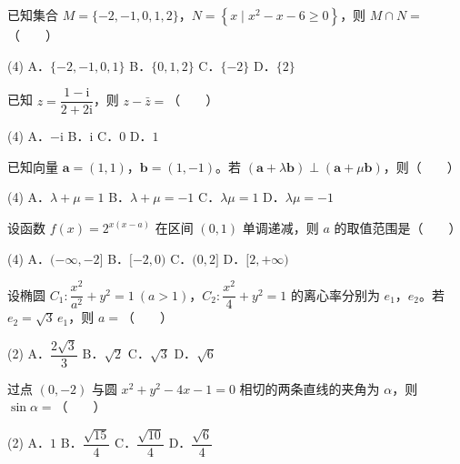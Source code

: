 \begin{question}
已知集合 $M=\{-2,-1,0,1,2\}$，$N=\left\{x\mid x^{2}-x-6\ge0\right\}$，则 $M\cap N=$\mbox{（　　）}

\begin{gkopts}(4)
\task A．$\{-2,-1,0,1\}$
\task B．$\{0,1,2\}$
\task C．$\{-2\}$
\task D．$\{2\}$
\end{gkopts}

\end{question}
\begin{question}
已知 $z=\dfrac{1-\mathrm i}{2+2\mathrm i}$，则 $z-\bar z=$\mbox{（　　）}

\begin{gkopts}(4)
\task A．$-\mathrm i$
\task B．$\mathrm i$
\task C．$0$
\task D．$1$
\end{gkopts}

\end{question}
\begin{question}
已知向量 $\boldsymbol a=(1,1)$，$\boldsymbol b=(1,-1)$。若 $(\boldsymbol a+\lambda\boldsymbol b)\perp(\boldsymbol a+\mu\boldsymbol b)$，则\mbox{（　　）}

\begin{gkopts}(4)
\task A．$\lambda+\mu=1$
\task B．$\lambda+\mu=-1$
\task C．$\lambda\mu=1$
\task D．$\lambda\mu=-1$
\end{gkopts}

\end{question}
\begin{question}
设函数 $f(x)=2^{x(x-a)}$ 在区间 $(0,1)$ 单调递减，则 $a$ 的取值范围是\mbox{（　　）}

\begin{gkopts}(4)
\task A．$(-\infty,-2]$
\task B．$[-2,0)$
\task C．$(0,2]$
\task D．$[2,+\infty)$
\end{gkopts}

\end{question}
\begin{question}
设椭圆 $C_1:\dfrac{x^{2}}{a^{2}}+y^{2}=1\ (a>1)$，$C_2:\dfrac{x^{2}}4+y^{2}=1$ 的离心率分别为 $e_1$，$e_2$。若 $e_2=\sqrt3\,e_1$，则 $a=$\mbox{（　　）}

\begin{gkopts}(2)
\task A．$\dfrac{2\sqrt3}3$
\task B．$\sqrt2$
\task C．$\sqrt3$
\task D．$\sqrt6$
\end{gkopts}

\end{question}
\begin{question}
过点 $(0,-2)$ 与圆 $x^{2}+y^{2}-4x-1=0$ 相切的两条直线的夹角为 $\alpha$，则 $\sin\alpha=$\mbox{（　　）}

\begin{gkopts}(2)
\task A．$1$
\task B．$\dfrac{\sqrt{15}}4$
\task C．$\dfrac{\sqrt{10}}4$
\task D．$\dfrac{\sqrt6}4$
\end{gkopts}

\end{question}
